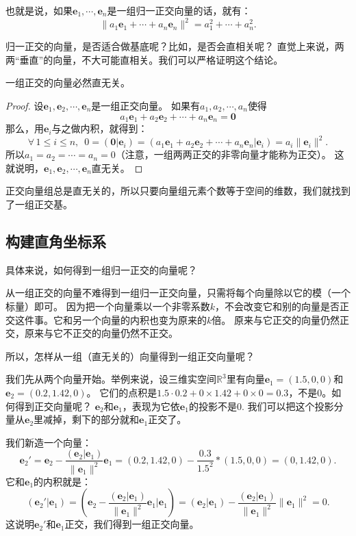 \documentclass[12pt,UTF8,fontset=none]{ctexbook}
\begin{document}
也就是说，如果$\mathbf{e}_1, \cdots , \mathbf{e}_n$是一组归一正交向量的话，就有：
$$ \|a_1\mathbf{e}_1 + \cdots + a_n\mathbf{e}_n\|^2 = a_1^2 + \cdots + a_n^2.$$

归一正交的向量，是否适合做基底呢？比如，是否会直相关呢？
直觉上来说，两两“垂直”的向量，不大可能直相关。我们可以严格证明这个结论。

\begin{pp}\label{pp:7_4}
    一组正交的向量必然直无关。
\end{pp}

\begin{proof} %
    设$\mathbf{e}_1, \mathbf{e}_2, \cdots , \mathbf{e}_n$是一组正交向量。
    如果有$a_1, a_2, \cdots, a_n$使得
    $$a_1\mathbf{e}_1 + a_2\mathbf{e}_2 + \cdots + a_n \mathbf{e}_n = \mathbf{0}$$
    那么，用$\mathbf{e}_i$与之做内积，就得到：
    $$\forall \, 1 \leqslant i \leqslant n, \,\,\, 0 = (\mathbf{0} |\mathbf{e}_i) = ( a_1\mathbf{e}_1 + a_2\mathbf{e}_2 + \cdots + a_n \mathbf{e}_n | \mathbf{e}_i) = a_i \|\mathbf{e}_i\|^2.$$
    所以$a_1 = a_2 = \cdots = a_n = 0$（注意，一组两两正交的非零向量才能称为正交）。
    这就说明，$\mathbf{e}_1, \mathbf{e}_2, \cdots , \mathbf{e}_n$直无关。
\end{proof}


正交向量组总是直无关的，所以只要向量组元素个数等于空间的维数，我们就找到了一组正交基。

\subsection{构建直角坐标系}
具体来说，如何得到一组归一正交的向量呢？

从一组正交的向量不难得到一组归一正交向量，只需将每个向量除以它的模（一个标量）即可。
因为把一个向量乘以一个非零系数$k$，不会改变它和别的向量是否正交这件事。它和另一个向量的内积也变为原来的$k$倍。
原来与它正交的向量仍然正交，原来与它不正交的向量仍然不正交。

所以，怎样从一组（直无关的）向量得到一组正交向量呢？

我们先从两个向量开始。举例来说，设三维实空间$\mathbb{R}^3$里有向量$\mathbf{e}_1 = (1.5,0,0)$和$\mathbf{e}_2 = (0.2,1.42,0)$。
它们的点积是$1.5\cdot 0.2 + 0\times 1.42 + 0\times 0 = 0.3$，不是0。如何得到正交向量呢？
$\mathbf{e}_2$和$\mathbf{e}_1$，表现为它依$\mathbf{e}_1$的投影不是0. 
我们可以把这个投影分量从$\mathbf{e}_2$里减掉，剩下的部分就和$\mathbf{e}_1$正交了。

我们新造一个向量：
$$ \mathbf{e}_2' = \mathbf{e}_2 - \frac{(\mathbf{e}_2|\mathbf{e}_1)}{\|\mathbf{e}_1\|^2}\mathbf{e}_1 = (0.2,1.42,0) - \frac{0.3}{1.5^2} * (1.5,0,0) = (0, 1.42, 0).$$
它和$\mathbf{e}_1$的内积就是：
$$ (\mathbf{e}_2' | \mathbf{e}_1)= (\mathbf{e}_2 - \frac{(\mathbf{e}_2|\mathbf{e}_1)}{\|\mathbf{e}_1\|^2}\mathbf{e}_1|\mathbf{e}_1) = (\mathbf{e}_2|\mathbf{e}_1) - \frac{(\mathbf{e}_2|\mathbf{e}_1)}{\|\mathbf{e}_1\|^2}\|\mathbf{e}_1\|^2 = 0.$$
这说明$\mathbf{e}_2'$和$\mathbf{e}_1$正交，我们得到一组正交向量。 
\end{document}
